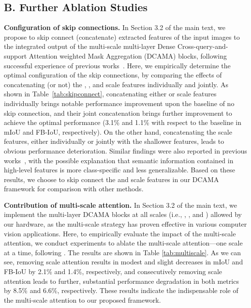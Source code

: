 \documentclass[runningheads,table,xcdraw]{llncs}
\begin{document}
\subsection*{B. Further Ablation Studies}
\textbf{Configuration of skip connections.}
In Section 3.2 of the main text, we propose to skip connect (concatenate) extracted features of the input images to the integrated output of the multi-scale multi-layer Dense Cross-query-and-support Attention weighted Mask Aggregation (DCAMA) blocks, following successful experience of previous works~\cite{ronneberger2015u,zhao2017pyramid}.
Here, we empirically determine the optimal configuration of the skip connections, by comparing the effects of concatenating (or not) the , , and  scale features individually and jointly.
As shown in Table~\ref{tab:skipconnect}, concatenating either  or  scale features individually brings notable performance improvement upon the baseline of no skip connection, and their joint concatenation brings further improvement to achieve the optimal performance (3.1\% and 1.1\% with respect to the baseline in mIoU and FB-IoU, respectively).
On the other hand, concatenating the  scale features, either individually or jointly with the shallower features, leads to obvious performance deterioration.
Similar findings were also reported in previous works~\cite{tian2020prior,zhang2019canet}, with the possible explanation that semantic information contained in high-level features is more class-specific and less generalizable.
Based on these results, we choose to skip connect the  and  scale features in our DCAMA framework for comparison with other methods.

\textbf{Contribution of multi-scale attention.}
In Section 3.2 of the main text, we implement the multi-layer DCAMA blocks at all scales (i.e., , , and ) allowed by our hardware, as the multi-scale strategy has proven effective in various computer vision applications.
Here, to empirically evaluate the impact of the multi-scale attention, we conduct experiments to ablate the multi-scale attention---one scale at a time, following \cite{min2021hypercorrelation}.
The results are shown in Table \ref{tab:multiscale}.
As we can see, removing  scale attention results in modest and slight decreases in mIoU and FB-IoU by 2.1\% and 1.4\%, respectively, and consecutively removing  scale attention leads to further, substantial performance degradation in both metrics by 8.5\% and 6.6\%, respectively.
These results indicate the indispensable role of the multi-scale attention to our proposed framework.
\end{document}
